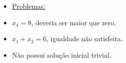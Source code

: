 \begin{frame}
\begin{columns}
		\begin{column}{5cm}
			\scriptsize
			\begin{itemize}
			\item[] \underline{Problemas:}
			\item $x_4 = 8$, deveria ser maior que zero.
			\item $x_1+x_2=6$, igualdade não satisfeita.
			\item Não possui solução inicial trivial.
			\end{itemize}
		\end{column}
	\end{columns}
\end{frame}



